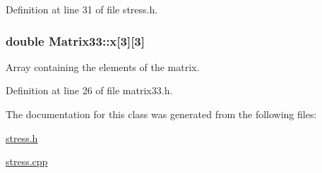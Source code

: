 \-Definition at line 31 of file stress.\-h.

\hypertarget{classMatrix33_af7f01fa466616eb7c8eda2e4d9f85cdd}{
\subsubsection[{x}]{\setlength{\rightskip}{0pt plus 5cm}double {\bf \-Matrix33\-::x}\mbox{[}3\mbox{]}\mbox{[}3\mbox{]}}}\label{de/d82/classMatrix33_af7f01fa466616eb7c8eda2e4d9f85cdd}


\-Array containing the elements of the matrix. 



\-Definition at line 26 of file matrix33.\-h.



\-The documentation for this class was generated from the following files\-:\begin{DoxyCompactItemize}
\item 
\hyperlink{stress_8h}{stress.\-h}\item 
\hyperlink{stress_8cpp}{stress.\-cpp}\end{DoxyCompactItemize}
